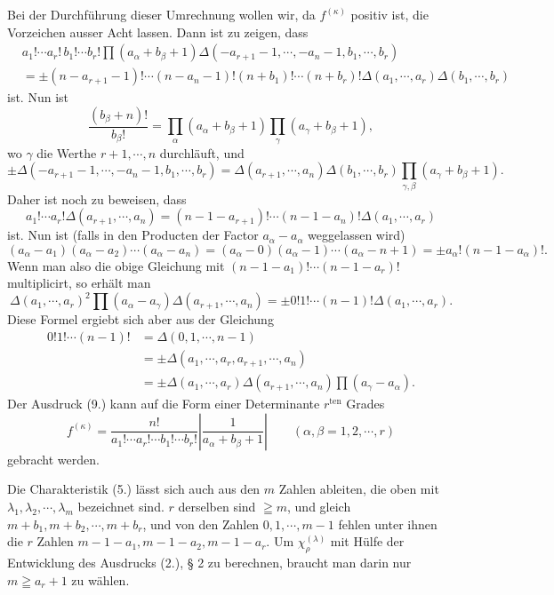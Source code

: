 \documentclass[11pt]{article}
\newcommand{\ten}{\mathrm{ten}}
\begin{document}
Bei der Durchführung dieser Umrechnung wollen wir, da $f^{(\kappa)}$ positiv ist, die Vorzeichen ausser Acht lassen. Dann ist zu zeigen, dass
\[
\begin{aligned}
 &a_1!\cdots a_r!\,b_1!\cdots b_r!\prod(a_\alpha+b_\beta+1)
 \Delta(-a_{r+1}-1,\cdots,-a_n-1,b_1,\cdots,b_r)\\
 &=\pm (n-a_{r+1}-1)!\cdots(n-a_n-1)!(n+b_1)!\cdots(n+b_r)!
 \Delta(a_1,\cdots,a_r)\Delta(b_1,\cdots,b_r)
\end{aligned}
\]
ist. Nun ist
\[
 \frac{(b_\beta+n)!}{b_\beta!}=\prod_\alpha(a_\alpha+b_\beta+1)\prod_\gamma(a_\gamma+b_\beta+1),
\]
wo $\gamma$ die Werthe $r+1,
\cdots,n$ durchläuft, und
\[
 \pm\Delta(-a_{r+1}-1,
\cdots,-a_n-1,b_1,
\cdots,b_r)=\Delta(a_{r+1},
\cdots,a_n)\Delta(b_1,
\cdots,b_r)
 \prod_{\gamma,
\beta}(a_\gamma+b_\beta+1).
\]
Daher ist noch zu beweisen, dass
\[
 a_1!\cdots a_r!\Delta(a_{r+1},\cdots,a_n)=(n-1-a_{r+1})!\cdots(n-1-a_n)!\Delta(a_1,
\cdots,a_r)
\]
ist. Nun ist (falls in den Producten der Factor $a_\alpha-a_\alpha$ weggelassen wird)
\[
 (a_\alpha-a_1)(a_\alpha-a_2)\cdots(a_\alpha-a_n)=(a_\alpha-0)(a_\alpha-1)\cdots(a_\alpha-n+1)=\pm a_\alpha!(n-1-a_\alpha)!.
\]
Wenn man also die obige Gleichung mit $(n-1-a_1)!\cdots(n-1-a_r)!$ multiplicirt, so erhält man
\[
 \Delta(a_1,\cdots,a_r)^2\prod(a_\alpha-a_\gamma)\Delta(a_{r+1},\cdots,a_n)
 =\pm0!1!\cdots(n-1)!\Delta(a_1,\cdots,a_r).
\]
Diese Formel ergiebt sich aber aus der Gleichung
\[
\begin{aligned}
0!1!\cdots(n-1)!&=\Delta(0,1,\cdots,n-1)\\
&=\pm\Delta(a_1,\cdots,a_r,a_{r+1},\cdots,a_n)\\
&=\pm\Delta(a_1,\cdots,a_r)\Delta(a_{r+1},\cdots,a_n)\prod(a_\gamma-a_\alpha).
\end{aligned}
\]
Der Ausdruck (9.) kann auf die Form einer Determinante $r^{\ten}$ Grades
\begin{equation}\tag{9.}
 f^{(\kappa)}=\frac{n!}{a_1!\cdots a_r!\cdots b_1!\cdots b_r!}
 \left|\frac{1}{a_\alpha+b_\beta+1}\right|\qquad(\alpha,
\beta=1,2,
\cdots,r)
\end{equation}
gebracht werden.

Die Charakteristik (5.) lässt sich auch aus den $m$ Zahlen ableiten, die oben mit $\lambda_1,
\lambda_2,
\cdots,
\lambda_m$ bezeichnet sind. $r$ derselben sind $\geqq m$, und gleich $m+b_1,m+b_2,
\cdots,m+b_r$, und von den Zahlen $0,1,
\cdots,m-1$ fehlen unter ihnen die $r$ Zahlen $m-1-a_1,m-1-a_2,m-1-a_r$. Um $\chi_\rho^{(\lambda)}$ mit Hülfe der Entwicklung des Ausdrucks (2.), § 2 zu berechnen, braucht man darin nur $m\geqq a_r+1$ zu wählen.
\end{document}
